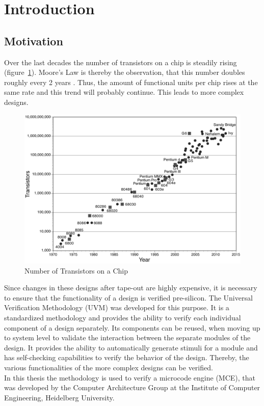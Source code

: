 \section{Introduction}

\subsection{Motivation}

Over the last decades the number of transistors on a chip is steadily rising (figure~\ref{fig:moors_law}).
Moore's Law is thereby the observation, that this number doubles roughly every 2 years \cite{moores_law}.
Thus, the amount of functional units per chip rises at the same rate and this trend will probably continue.
This leads to more complex designs.

\begin{figure}[htb]
 \centering
 \includegraphics[width=1.0\textwidth,angle=0]{images/moors_law.png}
 \caption{Number of Transistors on a Chip \cite{moore}}
\label{fig:moors_law}
\end{figure}

Since changes in these designs after tape-out are highly expensive, it is necessary to ensure that the functionality of a design is verified pre-silicon.
The Universal Verification Methodology (UVM) was developed for this purpose. 
It is a standardized methodology and provides the ability to verify each individual component of a design separately.
Its components can be reused, when moving up to system level to validate the interaction between the separate modules of the design.
It provides the ability to automatically generate stimuli for a module and has self-checking capabilities to verify the behavior of the design.
Thereby, the various functionalities of the more complex designs can be verified.\\
In this thesis the methodology is used to verify a microcode engine (MCE), that was developed by the Computer Architecture Group at the Institute of Computer
Engineering, Heidelberg University.


